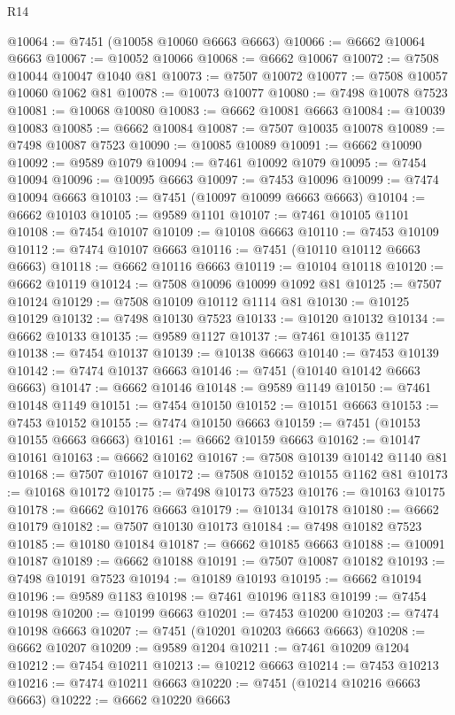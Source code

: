 \begin{lexlean}{R14}
\begin{coremodule}
{{{{{{{{{{{{{{{{{{{{{{{{{{{{{{{{{{{{{{{{{{{{{{{{{{{{{{{{{{{{{{{{{{{{{{{{{{{{{{{{{{@10064 := @7451 (@10058 @10060 @6663 @6663)
@10066 := @6662 @10064 @6663
@10067 := @10052 @10066
@10068 := @6662 @10067
@10072 := @7508 @10044 @10047 @1040 @81
@10073 := @7507 @10072
@10077 := @7508 @10057 @10060 @1062 @81
@10078 := @10073 @10077
@10080 := @7498 @10078 @7523
@10081 := @10068 @10080
@10083 := @6662 @10081 @6663
@10084 := @10039 @10083
@10085 := @6662 @10084
@10087 := @7507 @10035 @10078
@10089 := @7498 @10087 @7523
@10090 := @10085 @10089
@10091 := @6662 @10090
@10092 := @9589 @1079
@10094 := @7461 @10092 @1079
@10095 := @7454 @10094
@10096 := @10095 @6663
@10097 := @7453 @10096
@10099 := @7474 @10094 @6663
@10103 := @7451 (@10097 @10099 @6663 @6663)
@10104 := @6662 @10103
@10105 := @9589 @1101
@10107 := @7461 @10105 @1101
@10108 := @7454 @10107
@10109 := @10108 @6663
@10110 := @7453 @10109
@10112 := @7474 @10107 @6663
@10116 := @7451 (@10110 @10112 @6663 @6663)
@10118 := @6662 @10116 @6663
@10119 := @10104 @10118
@10120 := @6662 @10119
@10124 := @7508 @10096 @10099 @1092 @81
@10125 := @7507 @10124
@10129 := @7508 @10109 @10112 @1114 @81
@10130 := @10125 @10129
@10132 := @7498 @10130 @7523
@10133 := @10120 @10132
@10134 := @6662 @10133
@10135 := @9589 @1127
@10137 := @7461 @10135 @1127
@10138 := @7454 @10137
@10139 := @10138 @6663
@10140 := @7453 @10139
@10142 := @7474 @10137 @6663
@10146 := @7451 (@10140 @10142 @6663 @6663)
@10147 := @6662 @10146
@10148 := @9589 @1149
@10150 := @7461 @10148 @1149
@10151 := @7454 @10150
@10152 := @10151 @6663
@10153 := @7453 @10152
@10155 := @7474 @10150 @6663
@10159 := @7451 (@10153 @10155 @6663 @6663)
@10161 := @6662 @10159 @6663
@10162 := @10147 @10161
@10163 := @6662 @10162
@10167 := @7508 @10139 @10142 @1140 @81
@10168 := @7507 @10167
@10172 := @7508 @10152 @10155 @1162 @81
@10173 := @10168 @10172
@10175 := @7498 @10173 @7523
@10176 := @10163 @10175
@10178 := @6662 @10176 @6663
@10179 := @10134 @10178
@10180 := @6662 @10179
@10182 := @7507 @10130 @10173
@10184 := @7498 @10182 @7523
@10185 := @10180 @10184
@10187 := @6662 @10185 @6663
@10188 := @10091 @10187
@10189 := @6662 @10188
@10191 := @7507 @10087 @10182
@10193 := @7498 @10191 @7523
@10194 := @10189 @10193
@10195 := @6662 @10194
@10196 := @9589 @1183
@10198 := @7461 @10196 @1183
@10199 := @7454 @10198
@10200 := @10199 @6663
@10201 := @7453 @10200
@10203 := @7474 @10198 @6663
@10207 := @7451 (@10201 @10203 @6663 @6663)
@10208 := @6662 @10207
@10209 := @9589 @1204
@10211 := @7461 @10209 @1204
@10212 := @7454 @10211
@10213 := @10212 @6663
@10214 := @7453 @10213
@10216 := @7474 @10211 @6663
@10220 := @7451 (@10214 @10216 @6663 @6663)
@10222 := @6662 @10220 @6663
}}}}}}}}}}}}}}}}}}}}}}}}}}}}}}}}}}}}}}}}}}}}}}}}}}}}}}}}}}}}}}}}}}}}}}}}}}}}}}}}}}
\end{coremodule}
\end{lexlean}
